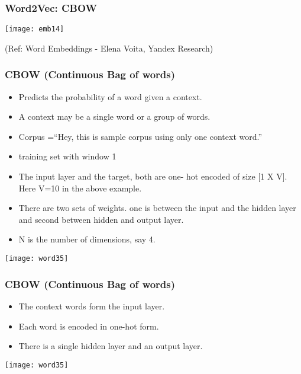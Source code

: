 \begin{frame}[fragile]\frametitle{Word2Vec: CBOW}
\begin{center}
\texttt{[image: emb14]}
\end{center}

{\tiny (Ref: Word Embeddings - Elena Voita, Yandex Research)}
\end{frame}


\begin{frame}[fragile]\frametitle{CBOW (Continuous Bag of words)}
\begin{itemize}
\item Predicts the probability of a word given a context. 
\item A context may be a single word or a group of words. 
\item  Corpus =``Hey, this is sample corpus using only one context word.''
\item training set with window 1
\item The input layer and the target, both are one- hot encoded of size [1 X V]. Here V=10 in the above example.
\item There are two sets of weights. one is between the input and the hidden layer and second between hidden and output layer.
\item N is the number of dimensions, say 4.
\end{itemize}
\begin{center}
\texttt{[image: word35]}
\end{center}
\end{frame}

\begin{frame}[fragile]\frametitle{CBOW (Continuous Bag of words)}
\begin{itemize}
\item The context words form the input layer. 
\item Each word is encoded in one-hot form.
\item There is a single hidden layer and an output layer.
\end{itemize}
\begin{center}
\texttt{[image: word35]}
\end{center}

\end{frame}

